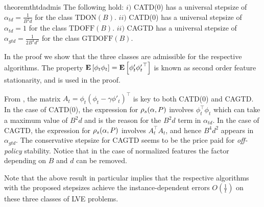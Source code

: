 \begin{table}[h]
\caption{Here, $S,A,\gamma$ are fixed across all the class and the second column shows the quantities that vary across the respective classes. These three capture \emph{on/off-policy} learning scenarios arising in RL.}
\end{table}
\fi
\begin{restatable}{theorem}{thtdadmis}\label{th:tdadmis}
The following hold:
$i)$ CATD(0) has a universal stepsize of $\alpha_{td}=\frac{1}{B^2d}$ for  the class $\text{TDON}(B)$.
$ii)$ CATD(0) has a universal stepsize of $\alpha_{td}=1$ for  the class $\text{TDOFF}(B)$.
$ii)$ CAGTD has a universal stepsize of $\alpha_{gtd}=\frac{1}{2B^4d^2}$ for the class $\text{GTDOFF}(B)$.
\end{restatable}
In the proof we show that the three classes are admissible for the respective algorithms.
The property $\mathbf{E}\left[\phi_t\phi_t\right]=\mathbf{E}\left[\phi'_t{\phi'_t}^\top\right]$ is known as second order feature stationarity, and is used in the proof.
\fi

 From , the matrix $A_t=\phi_t(\phi_t-\gamma\phi'_t)^\top$ is key to both CATD(0) and CAGTD. In the case of CATD(0),  the expression for $\rho_s(\alpha,P)$ involves $\phi^\top_t\phi_t$ which can take a maximum value of $B^2d$  and is the reason for the $B^2d$ term in $\alpha_{td}$. In the case of CAGTD, the expression for $\rho_s(\alpha,P)$ involves $A_t^\top A_t$, and hence $B^4d^2$ appears in $\alpha_{gtd}$. 
The conservative stepsize for CAGTD seems to be the price paid for \emph{off-policy} stability. Notice that in the case of normalized features the factor depending on $B$ and $d$ can be removed.

Note that the above result in particular implies that the respective algorithms with the proposed stepsizes achieve the instance-dependent errors $O(\frac{1}{t})$ on these three classes of LVE problems.

